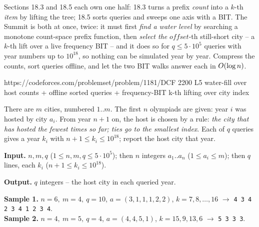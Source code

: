 
\begin{notebox}
Sections 18.3 and 18.5 each own one half: 18.3 turns a prefix \emph{count} into a
\(k\)-th \emph{item} by lifting the tree; 18.5 sorts queries and sweeps one axis
with a BIT. The Summit is both at once, twice: it must first \emph{find a water
level} by searching a monotone count-space prefix function, then \emph{select the}
\(\mathit{offset}\)-th still-short city -- a \(k\)-th lift over a live frequency
BIT -- and it does so for \(q\le 5\cdot10^5\) queries with year numbers up to
\(10^{18}\), so nothing can be simulated year by year. Compress the counts, sort
queries offline, and let the two BIT walks answer each in \(O(\log n)\).
\end{notebox}

  {https://codeforces.com/problemset/problem/1181/D}{CF 2200 L5}
  {water-fill over host counts + offline sorted queries + frequency-BIT k-th lifting over city index}

\begin{problemstatement}[CF 1181D Irrigation]
There are \(m\) cities, numbered \(1..m\). The first \(n\) olympiads are given:
year \(i\) was hosted by city \(a_i\). From year \(n+1\) on, the host is chosen by
a rule: \emph{the city that has hosted the fewest times so far; ties go to the
smallest index}. Each of \(q\) queries gives a year \(k_i\) with
\(n+1\le k_i\le 10^{18}\); report the host city that year.

\textbf{Input.} \(n,m,q\) (\(1\le n,m,q\le 5\cdot10^5\)); then \(n\) integers
\(a_1..a_n\) (\(1\le a_i\le m\)); then \(q\) lines, each \(k_i\)
(\(n+1\le k_i\le 10^{18}\)).

\textbf{Output.} \(q\) integers -- the host city in each queried year.

\textbf{Sample 1.} \(n=6,\ m=4,\ q=10\), \(a=(3,1,1,1,2,2)\),
\(k=7,8,\dots,16\) \(\to\) \texttt{4 3 4 2 3 4 1 2 3 4}.\\
\textbf{Sample 2.} \(n=4,\ m=5,\ q=4\), \(a=(4,4,5,1)\),
\(k=15,9,13,6\) \(\to\) \texttt{5 3 3 3}.
\end{problemstatement}

